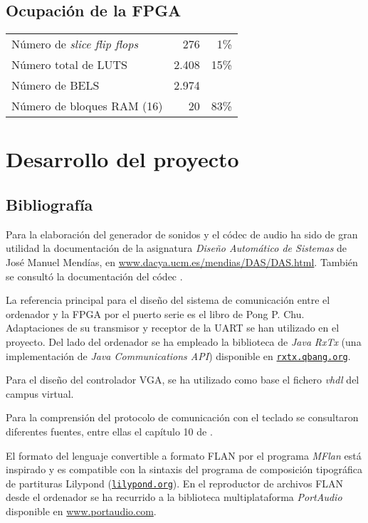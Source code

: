 \documentclass{article}
\begin{document}
\subsection{Ocupación de la FPGA}

	\begin{center}\begin{tabular}{l r r}
		Número de {\itshape slice flip flops} & 276 & 1\% \\
		Número total de LUTS & 2.408 & 15\% \\
		Número de BELS & 2.974 & \\
		Número de bloques RAM (16) & 20 & 83\% \\
	\end{tabular}\end{center}

\section{Desarrollo del proyecto}

\subsection{Bibliografía}
	Para la elaboración del generador de sonidos y el códec de audio ha sido de gran utilidad la documentación de la asignatura {\itshape Diseño Automático de Sistemas} de José Manuel Mendías, en \url{www.dacya.ucm.es/mendias/DAS/DAS.html}. También se consultó la documentación del códec \cite{AK4565}. 

	\medskip La referencia principal para el diseño del sistema de comunicación entre el ordenador y la FPGA por el puerto serie es el libro \cite{PCHU} de Pong P. Chu. Adaptaciones de su transmisor y receptor de la UART se han utilizado en el proyecto. Del lado del ordenador se ha empleado la biblioteca de {\itshape Java} {\itshape RxTx} (una implementación de {\itshape Java Communications API}) disponible en \href{http://rxtx.qbang.org}{\nolinkurl{rxtx.qbang.org}}.

	\medskip Para el diseño del controlador VGA, se ha utilizado como base el fichero {\itshape vhdl} del campus virtual.

	\medskip Para la comprensión del protocolo de comunicación con el teclado se consultaron diferentes fuentes, entre ellas el capítulo 10 de \cite{RPDS}.

	\medskip El formato del lenguaje convertible a formato FLAN por el programa {\itshape MFlan} está inspirado y es compatible con la sintaxis del programa de composición tipográfica de partituras Lilypond (\href{http://lilypond.org}{\nolinkurl{lilypond.org}}). En el reproductor de archivos FLAN desde el ordenador se ha recurrido a la biblioteca multiplataforma {\itshape PortAudio} disponible en \url{www.portaudio.com}.
\end{document}
